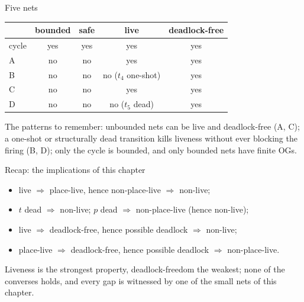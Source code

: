 \begin{examplebox}{Five nets}
\begin{center}
\small
\begin{tabular}{lcccc}
\toprule
 & \textbf{bounded} & \textbf{safe} & \textbf{live} & \textbf{deadlock-free} \\
\midrule
cycle & yes & yes & yes & yes \\
A & no & no & yes & yes \\
B & no & no & no ($t_4$ one-shot) & yes \\
C & no & no & yes & yes \\
D & no & no & no ($t_5$ dead) & yes \\
\bottomrule
\end{tabular}
\end{center}
The patterns to remember: unbounded nets can be live and deadlock-free (A, C); a one-shot or structurally dead transition kills liveness without ever blocking the firing (B, D); only the cycle is bounded, and only bounded nets have finite OGs.
\end{examplebox}

\begin{notebox}{Recap: the implications of this chapter}
\begin{itemize}
  \item live $\Rightarrow$ place-live, hence non-place-live $\Rightarrow$ non-live;
  \item $t$ dead $\Rightarrow$ non-live; $p$ dead $\Rightarrow$ non-place-live (hence non-live);
  \item live $\Rightarrow$ deadlock-free, hence possible deadlock $\Rightarrow$ non-live;
  \item place-live $\Rightarrow$ deadlock-free, hence possible deadlock $\Rightarrow$ non-place-live.
\end{itemize}
Liveness is the strongest property, deadlock-freedom the weakest; none of the converses holds, and every gap is witnessed by one of the small nets of this chapter.
\end{notebox}
